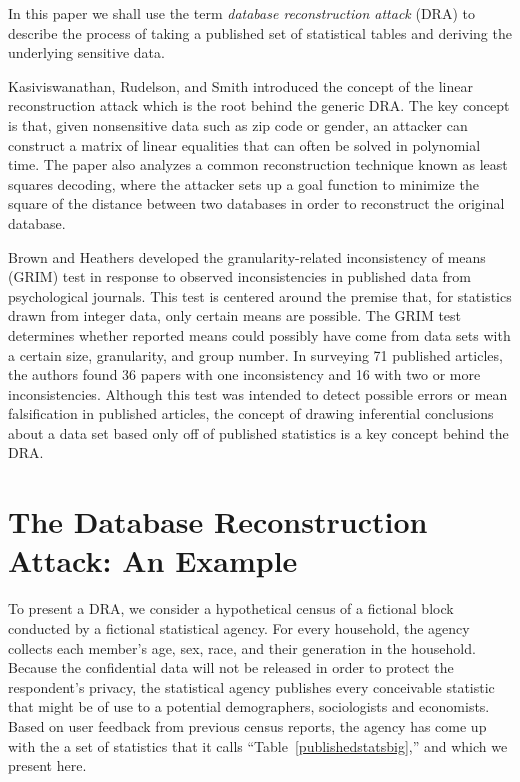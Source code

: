 \documentclass[runningheads]{llncs}
\begin{document}
In this paper we shall use
the term \emph{database reconstruction attack} (DRA) to describe the process of
taking a published set of statistical tables and deriving the
underlying sensitive data. 

Kasiviswanathan, Rudelson, and Smith\cite{Kasiviswanathan:2013:PLR:2627817.2627919} introduced
the concept of the linear reconstruction attack which is the root
behind the generic DRA. The key concept is that,
given nonsensitive data such as zip code or gender, an attacker
can construct a matrix of linear equalities that can often be solved
in polynomial time. The paper also analyzes a common reconstruction
technique known as least squares decoding, where the attacker sets up
a goal function to minimize the square of the distance between two
databases in order to reconstruct the original database. 

Brown and Heathers\cite{doi:10.1177/1948550616673876} developed the
granularity-related inconsistency of means (GRIM) test in response to
observed inconsistencies in published data from psychological
journals. This test is centered around the premise that, for
statistics drawn from integer data, only certain means are
possible. The GRIM test determines whether reported means could
possibly have come from data sets with a certain size, granularity,
and group number. In surveying 71 published articles, the authors
found 36 papers with one inconsistency and 16 with two or more
inconsistencies. Although this test was intended to detect possible
errors or mean falsification in published articles, the concept of
drawing inferential conclusions about a data set based only off of
published statistics is a key concept behind the DRA.

\section{The Database Reconstruction Attack: An Example}

To present a DRA, we consider a hypothetical
census of a fictional block conducted by a fictional statistical
agency. For every household, the agency collects each member's age,
sex, race, and their generation in the household.  Because the
confidential data will not be released in order to protect the
respondent's privacy, the statistical agency 
publishes every conceivable statistic that might be of use to a
potential demographers, sociologists and economists. Based on user
feedback from previous census reports, the agency has come up with the
a set of statistics that it calls ``Table~\ref{publishedstatsbig},''
and which we present here.
\end{document}
